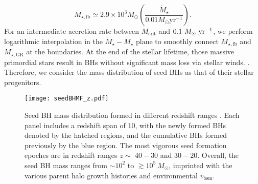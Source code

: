 \documentclass[twocolumn, twocolappendix]{aastex63}
\newcommand{\Msun}{M_\odot}
\newcommand{\Msunyr}{M_\odot~{\rm yr}^{-1}}
\newcommand{\vbsm}{v_\mathrm{bsm}}
\newcommand{\Mdot}{\dot{M}}
\begin{document}
\begin{CJK*}{UTF8}{gbsn}
%
\begin{equation}
M_{\star, \mathrm{fb}} \simeq 2.9 \times 10^{3} \Msun\left(\frac{\dot{M}_{\star}}{0.01 M_{\odot} \mathrm{yr}^{-1}}\right).
\end{equation}
%
For an intermediate accretion rate between $\Mdot_\mathrm{crit}$ and $0.1~\Msunyr$, 
we perform logarithmic interpolation in the $\Mdot_\star - M_\star$ plane to smoothly connect 
$M_{\star, \mathrm{fb}}$ and $M_{\star, \mathrm{GR}}$ at the boundaries.
At the end of the stellar lifetime, those massive primordial stars result in BHs without significant mass loss via stellar winds.
\citep{2003ApJ...591..288H,2010ApJ...714.1217B,2015MNRAS.451.4086S}.
Therefore, we consider the mass distribution of seed BHs as that of their stellar progenitors. 


\begin{figure*}
\centering
\texttt{[image: seedBHMF\_z.pdf]}
\caption{
Seed BH mass distribution formed in different redshift ranges . 
Each panel includes a redshift span of 10, 
with the newly formed BHs denoted by the hatched regions, 
and the cumulative BHs formed previously by the blue region.
The most vigorous seed formation epoches are in redshift ranges $z\sim$ $40-30$ and $30-20$.
Overall, the seed BH mass ranges from $\sim 10^2$ to $\gtrsim 10^5~\Msun$, 
imprinted with the various parent halo growth histories and environmental $\vbsm$. 
}
\label{fig:seedmf}
\end{figure*}



\end{CJK*}
\end{document}
